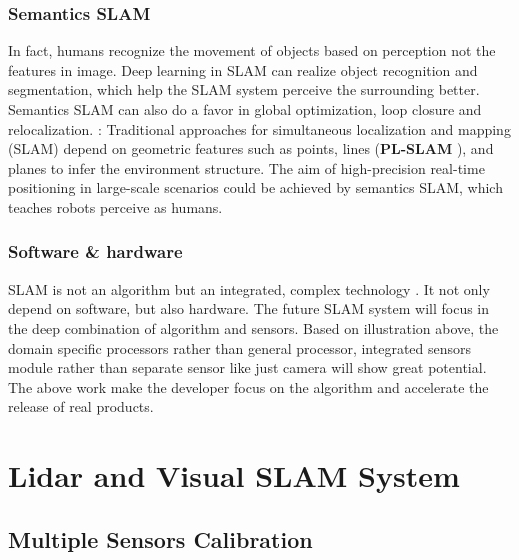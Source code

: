 \documentclass[journal,transmag]{IEEEtran}
\begin{document}
\subsubsection{Semantics SLAM}
In fact, humans recognize the movement of objects based on perception not the features in image.  Deep learning in SLAM can realize object recognition and segmentation, which help the SLAM system perceive the surrounding better. Semantics SLAM can also do a favor in global optimization, loop closure and relocalization. \cite{atanasov2018unifying}: Traditional approaches for simultaneous localization and mapping (SLAM) depend on geometric features such as points, lines (\textbf{PL-SLAM} \cite{gomez2019pl}), and planes to infer the environment structure. The aim of high-precision real-time positioning in large-scale scenarios could be achieved by semantics SLAM, which teaches robots perceive as humans. 
\subsubsection{Software \& hardware}
SLAM is not an algorithm but an integrated, complex technology \cite{riisgaard2005dummies}. It not only depend on software, but also hardware. The future SLAM system will focus in the deep combination of algorithm and sensors. Based on illustration above, the domain specific processors rather than general processor, integrated sensors module rather than separate sensor like just camera will show great potential. The above work make the developer focus on the algorithm and accelerate the release of real products.

\section{Lidar and Visual SLAM System}
\subsection{Multiple Sensors Calibration}
\end{document}
